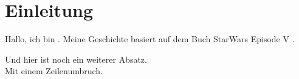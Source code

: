 \chapter{Einleitung}

Hallo, ich bin \@author. Meine Geschichte basiert auf dem Buch StarWars Episode V \cite{starwars5}.

Und hier ist noch ein weiterer Absatz. \\
Mit einem Zeilenumbruch.
